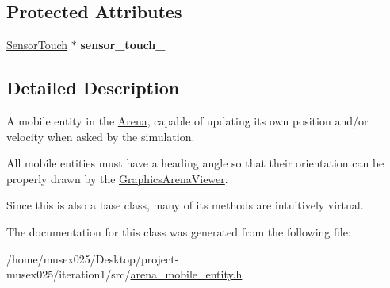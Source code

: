 \subsection*{Protected Attributes}
\begin{DoxyCompactItemize}
\item 
\hyperlink{classSensorTouch}{Sensor\+Touch} $\ast$ {\bfseries sensor\+\_\+touch\+\_\+}\hypertarget{classArenaMobileEntity_a260fd3fba196ee9ab56f9f2ce6ab4a21}{}\label{classArenaMobileEntity_a260fd3fba196ee9ab56f9f2ce6ab4a21}

\end{DoxyCompactItemize}


\subsection{Detailed Description}
A mobile entity in the \hyperlink{classArena}{Arena}, capable of updating its own position and/or velocity when asked by the simulation. 

All mobile entities must have a heading angle so that their orientation can be properly drawn by the \hyperlink{classGraphicsArenaViewer}{Graphics\+Arena\+Viewer}.

Since this is also a base class, many of its methods are intuitively {\ttfamily virtual}. 

The documentation for this class was generated from the following file\+:\begin{DoxyCompactItemize}
\item 
/home/musex025/\+Desktop/project-\/musex025/iteration1/src/\hyperlink{arena__mobile__entity_8h}{arena\+\_\+mobile\+\_\+entity.\+h}\end{DoxyCompactItemize}
